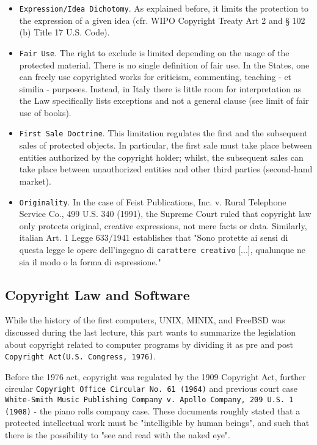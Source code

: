 \begin{itemize}
    \item \texttt{Expression/Idea Dichotomy}. As explained before, it limits the protection to the expression of a given idea (cfr. WIPO Copyright Treaty Art 2 and § 102 (b) Title 17 U.S. Code).
    \item \texttt{Fair Use}. The right to exclude is limited depending on the usage of the protected material. There is no single definition of fair use. In the States, one can freely use copyrighted works for criticism, commenting, teaching - et similia - purposes. Instead, in Italy there is little room for interpretation as the Law specifically lists exceptions and not a general clause (see limit of fair use of books).
    \item \texttt{First Sale Doctrine}. This limitation regulates the first and the subsequent sales of protected objects. In particular, the first sale must take place between entities authorized by the copyright holder; whilst, the subsequent sales can take place between unauthorized entities and other third parties (second-hand market).
    \item \texttt{Originality}. In the case of Feist Publications, Inc. v. Rural Telephone Service Co., 499 U.S. 340 (1991), the Supreme Court ruled that copyright law only protects original, creative expressions, not mere facts or data. Similarly, italian Art. 1 Legge 633/1941 establishes that "Sono protette ai sensi di questa legge le opere dell'ingegno di \texttt{carattere creativo} [...], qualunque ne sia il modo o la forma di espressione."
\end{itemize}

\subsection*{Copyright Law and Software}

While the history of the first computers, UNIX, MINIX, and FreeBSD was discussed during the last lecture, this part wants to summarize the legislation about copyright related to computer programs by dividing it as pre and post \texttt{Copyright Act(U.S. Congress, 1976)}.

Before the 1976 act, copyright was regulated by the 1909 Copyright Act, further circular \texttt{Copyright Office Circular No. 61 (1964)} and previous court case \texttt{White-Smith Music Publishing Company v. Apollo Company, 209 U.S. 1 (1908)} - the piano rolls company case. These documents roughly stated that a protected intellectual work must be "intelligible by human beings", and such that there is the possibility to "see and read with the naked eye".

